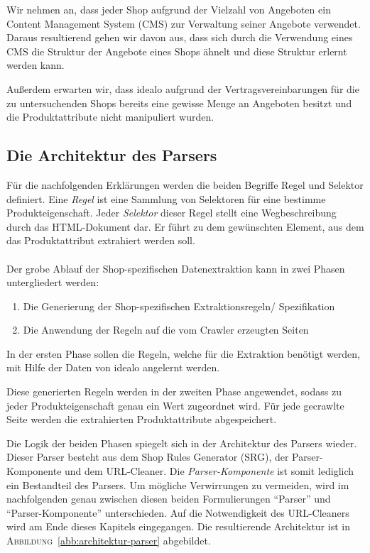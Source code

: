 Wir nehmen an, dass jeder Shop aufgrund der Vielzahl von Angeboten ein Content Management System (CMS) zur Verwaltung
seiner Angebote verwendet.
Daraus resultierend gehen wir davon aus, dass sich durch die Verwendung eines CMS die Struktur der Angebote eines Shops
ähnelt und diese Struktur erlernt werden kann.

Außerdem erwarten wir, dass idealo aufgrund der Vertragsvereinbarungen für die zu untersuchenden Shops bereits
eine gewisse Menge an Angeboten besitzt und die Produktattribute nicht manipuliert wurden.

\subsection{Die Architektur des Parsers}
\label{subsec:grundidee}

Für die nachfolgenden Erklärungen werden die beiden Begriffe Regel und Selektor definiert.
Eine \textit{Regel} ist eine Sammlung von Selektoren für eine bestimme Produkteigenschaft.
Jeder \textit{Selektor} dieser Regel stellt eine Wegbeschreibung durch das HTML-Dokument dar.
Er führt zu dem gewünschten Element, aus dem das Produktattribut extrahiert werden soll.
\\
~\\
Der grobe Ablauf der Shop-spezifischen Datenextraktion kann in zwei Phasen untergliedert werden:
\begin{enumerate}
    \item Die Generierung der Shop-spezifischen Extraktionsregeln/ Spezifikation
    \item Die Anwendung der Regeln auf die vom Crawler erzeugten Seiten
\end{enumerate}

In der ersten Phase sollen die Regeln, welche für die Extraktion benötigt werden, mit Hilfe der Daten von idealo
angelernt werden.

Diese generierten Regeln werden in der zweiten Phase angewendet, sodass zu jeder Produkteigenschaft genau ein Wert
zugeordnet wird.
Für jede gecrawlte Seite werden die extrahierten Produktattribute abgespeichert.

Die Logik der beiden Phasen spiegelt sich in der Architektur des Parsers wieder.
Dieser Parser besteht aus dem Shop Rules Generator (SRG), der Parser-Komponente und dem URL-Cleaner.
Die \emph{Parser-Komponente} ist somit lediglich ein Bestandteil des Parsers.
Um mögliche Verwirrungen zu vermeiden, wird im nachfolgenden genau zwischen diesen beiden Formulierungen ``Parser''
und ``Parser-Komponente'' unterschieden.
Auf die Notwendigkeit des URL-Cleaners wird am Ende dieses Kapitels eingegangen.
Die resultierende Architektur ist in \textsc{Abbildung}~\ref{abb:architektur-parser} abgebildet.

